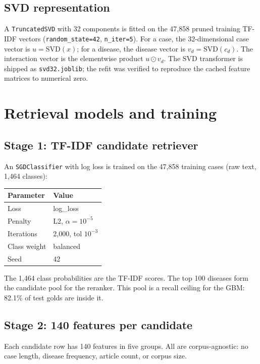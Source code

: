 \documentclass[11pt,a4paper]{article}
\newcommand{\code}[1]{\texttt{\small #1}}
\begin{document}
\subsection{SVD representation}

A \code{TruncatedSVD} with 32 components is fitted on the 47,858 pruned training
TF-IDF vectors (\code{random\_state=42}, \code{n\_iter=5}). For a case, the
32-dimensional case vector is $u=\mathrm{SVD}(x)$; for a disease, the disease
vector is $v_d=\mathrm{SVD}(c_d)$. The interaction vector is the elementwise
product $u\odot v_d$. The SVD transformer is shipped as \code{svd32.joblib}; the
refit was verified to reproduce the cached feature matrices to numerical zero.

\section{Retrieval models and training}
\label{sec:retrieval}

\subsection{Stage 1: TF-IDF candidate retriever}

An \code{SGDClassifier} with log loss is trained on the 47,858 training cases
(raw text, 1,464 classes):
\begin{center}
\begin{tabular}{ll}
\toprule
Parameter & Value\\
\midrule
Loss & log\_loss\\
Penalty & L2, $\alpha=10^{-5}$\\
Iterations & 2,000, tol $10^{-3}$\\
Class weight & balanced\\
Seed & 42\\
\bottomrule
\end{tabular}
\end{center}
The 1,464 class probabilities are the TF-IDF scores. The top 100 diseases form the
candidate pool for the reranker. This pool is a recall ceiling for the GBM:
82.1\% of test golds are inside it.

\subsection{Stage 2: 140 features per candidate}

Each candidate row has 140 features in five groups. All are corpus-agnostic: no
case length, disease frequency, article count, or corpus size.
\end{document}

